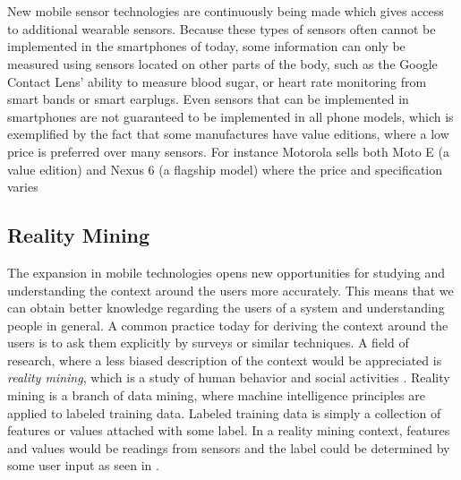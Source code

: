 \\\\
New mobile sensor technologies are continuously being made which gives access to additional wearable sensors. Because these types of sensors often cannot be implemented in the smartphones of today, some information can only be measured using sensors located on other parts of the body, such as the Google Contact Lens' ability to measure blood sugar, or heart rate monitoring from smart bands or smart earplugs. Even sensors that can be implemented in smartphones are not guaranteed to be implemented in all phone models, which is exemplified by the fact that some manufactures have value editions, where a low price is preferred over many sensors. For instance Motorola sells both Moto E (a value edition) and Nexus 6 (a flagship model) where the price and specification varies \parencite{moto_e_compared_to_nexus_6}

\subsection{Reality Mining}
\label{sub:reality_mining}
The expansion in mobile technologies opens new opportunities for studying and understanding the context around the users more accurately. This means that we can obtain better knowledge regarding the users of a system and understanding people in general. A common practice today for deriving the context around the users is to ask them explicitly by surveys or similar techniques. A field of research, where a less biased description of the context would be appreciated is \emph{reality mining}, which is a study of human behavior and social activities \parencite{madan2009_reality_mining_privacy}. Reality mining is a branch of data mining, where machine intelligence principles are applied to labeled training data. Labeled training data is simply a collection of features or values attached with some label. In a reality mining context, features and values would be readings from sensors and the label could be determined by some user input as seen in .

